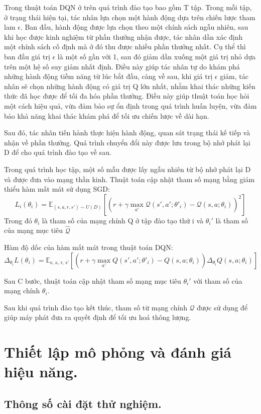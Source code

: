 \documentclass{uetgraduation}
\begin{document}
Trong thuật toán DQN ở trên quá trình đào tạo bao gồm T tập. Trong mỗi tập, ở trạng thái hiện tại, tác nhân lựa chọn một hành động dựa trên chiến lược tham lam $\epsilon$.
Ban đầu, hành động được lựa chọn theo một chính sách ngẫu nhiên, sau khi học được kinh nghiệm từ phần thưởng nhận được, tác nhân dần xác định một chính sách cố định mà ở
đó thu được nhiều phần thưởng nhất. Cụ thể thì ban đầu giá trị $\epsilon$ là một số gần với 1, sau đó giảm dần xuống một giá trị nhỏ dựa trên một hệ số suy giảm nhất định.
Điều này giúp tác nhân tự do khám phá những hành động tiềm năng từ lúc bắt đầu, càng về sau, khi giá trị $\epsilon$ giảm, tác nhân sẽ chọn những hành động có giá trị Q lớn
nhất, nhằm khai thác những kiến thức đã học được để tối đa hóa phần thưởng. Điều này giúp thuật toán học hỏi một cách hiệu quả, vừa đảm bảo sự ổn định trong quá trình
huấn luyện, vừa đảm bảo khả năng khai thác khám phá để tối ưu chiến lược về dài hạn.

Sau đó, tác nhân tiến hành thực hiện hành động, quan sát trạng thái kế tiếp và nhận về phần thưởng. Quá trình chuyển đổi này được lưu trong bộ nhớ phát lại D để cho
quá trình đào tạo về sau.

Trong quá trình học tập, một số mẫu được lấy ngẫu nhiên từ bộ nhớ phát lại D và được đưa vào mạng thần kinh. Thuật toán cập nhật tham số mạng bằng giảm thiểu hàm mất mát
sử dụng SGD:
\[
L_i(\theta_i) = \mathbb{E}_{(s, a, r, s') \sim U(D)} \left[ \left( r + \gamma \max_{a'} \mathcal{Q}(s', a'; \theta'_i) - \mathcal{Q}(s, a; \theta_i) \right)^2 \right]
\]
Trong đó $\theta_i$ là tham số của mạng chính Q ở tập đào tạo thứ i và $\theta_i'$ là tham số của mạng mục tiêu $\hat{\mathcal{Q}}$

Hàm độ dốc của hàm mất mát trong thuật toán DQN:
\[
\Delta_{\theta_i} L(\theta_i) = \mathbb{E}_\text{s, a, r, s'} [(r + \gamma \max_{a'} Q(s', a'; \theta'_i) - Q(s, a; \theta_i)) \Delta_{\theta_i} Q(s, a; \theta_i)] 
\]

Sau C bước, thuật toán cập nhật tham số mạng mục tiêu $\theta_i'$ với tham số của mạng chính $\theta_i$.

Sau khi quá trình đào tạo kết thúc, tham số từ mạng chính $\mathcal{Q}$ được sử dụng để giúp máy phát đưa ra quyết định để tối ưu hoá thông lượng.

\chapter{Thiết lập mô phỏng và đánh giá hiệu năng.}
\section{Thông số cài đặt thử nghiệm.}
\end{document}
